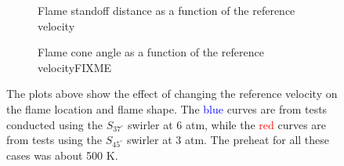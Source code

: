 \begin{figure}

\centering

\begin{subfigure}{\linewidth}
  \centering
  
  \caption{Flame standoff distance as a function of the reference velocity}
  \label{fig:pressureDistance}
\end{subfigure}

\begin{subfigure}{\linewidth}
  \centering
  
  \caption{Flame cone angle as a function of the reference velocityFIXME}
  \label{fig:pressureAngle}
\end{subfigure}

\caption[Effect of Combustor Pressure on Flame Location and Shape]{The plots above show the effect of changing the reference velocity on the flame location and flame shape. The \textcolor{blue}{blue} curves are from tests conducted using the \(S_{37^\circ}\) swirler at 6 atm, while the \textcolor{red}{red} curves are from tests using the \(S_{45^\circ}\) swirler at 3 atm. The preheat for all these cases was about 500 K.}

\label{fig:pressureResults}

\end{figure}

